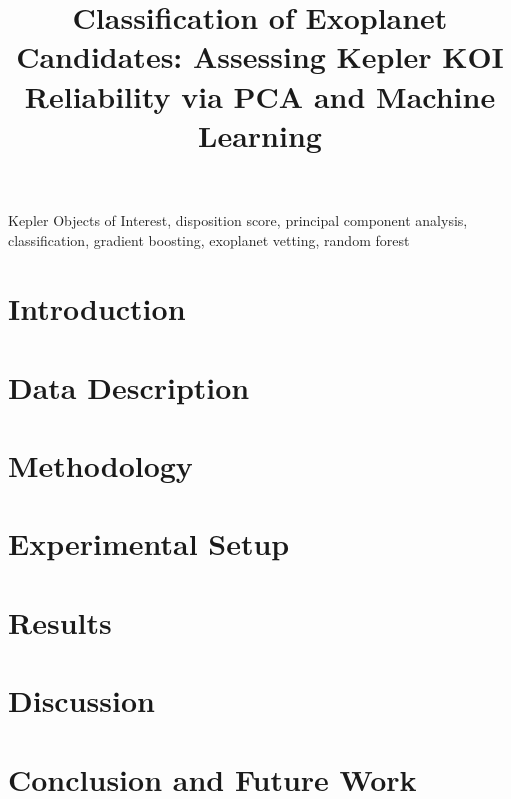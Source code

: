 \documentclass[conference]{IEEEtran}
\begin{document}
\title{Classification of Exoplanet Candidates: Assessing Kepler KOI Reliability via PCA and Machine Learning}

\author{
}

\maketitle

\begin{abstract}

\end{abstract}

\begin{IEEEkeywords}
Kepler Objects of Interest, disposition score, principal component analysis, classification, gradient boosting, exoplanet vetting, random forest
\end{IEEEkeywords}

\section{Introduction}


\section{Data Description}


\section{Methodology}


\section{Experimental Setup}


\section{Results}


\section{Discussion}


\section{Conclusion and Future Work}



\end{document}
